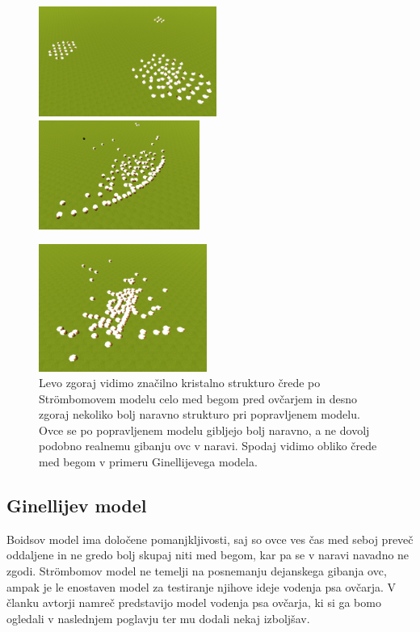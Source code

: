 \begin{figure}[ht]  %
	\centering
	\includegraphics[width=0.52\textwidth]{../poglavja/images/stroembom-creda.png}
	\includegraphics[width=0.47\textwidth]{../poglavja/images/popravljen-stroembom-creda.png}
	
	\includegraphics[width=0.49\textwidth]{../poglavja/images/ginelli-creda.png}
	\caption[Struktura črede po vseh treh modelih]{Levo zgoraj vidimo značilno kristalno strukturo črede po Str{\"o}mbomovem modelu celo med begom pred ovčarjem in desno zgoraj nekoliko bolj naravno strukturo pri popravljenem modelu. Ovce se po popravljenem modelu gibljejo bolj naravno, a ne dovolj podobno realnemu gibanju ovc v naravi. Spodaj vidimo obliko črede med begom v primeru Ginellijevega modela.} %
	\label{fig:stroembom-olje}
\end{figure}

\subsection{Ginellijev model}\label{ginelli}

Boidsov model ima določene pomanjkljivosti, saj so ovce ves čas med seboj preveč oddaljene in ne gredo bolj skupaj niti med begom, kar pa se v naravi navadno ne zgodi. Str{\"o}mbomov model ne temelji na posnemanju dejanskega gibanja ovc, ampak je le enostaven model za testiranje njihove ideje vodenja psa ovčarja. V članku avtorji namreč predstavijo model vodenja psa ovčarja, ki si ga bomo ogledali v naslednjem poglavju ter mu dodali nekaj izboljšav.


